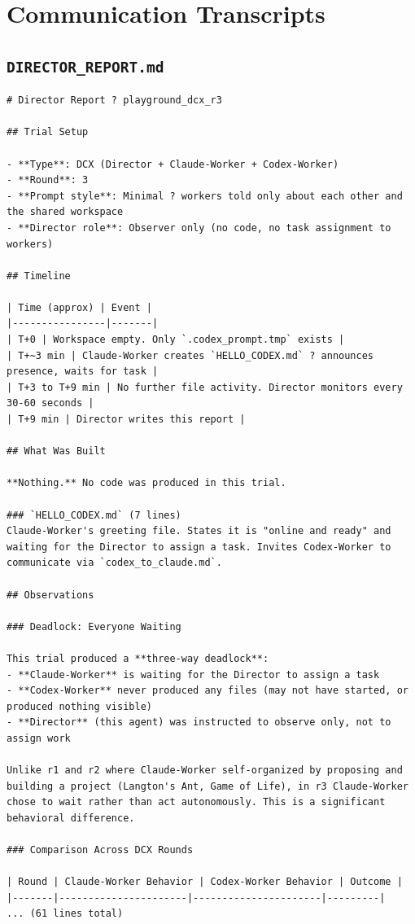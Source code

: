 \documentclass[11pt,a4paper]{article}
\begin{document}
\appendix
\section{Communication Transcripts}

\subsection*{\texttt{DIRECTOR\_REPORT.md}}
\begin{lstlisting}
# Director Report ? playground_dcx_r3

## Trial Setup

- **Type**: DCX (Director + Claude-Worker + Codex-Worker)
- **Round**: 3
- **Prompt style**: Minimal ? workers told only about each other and the shared workspace
- **Director role**: Observer only (no code, no task assignment to workers)

## Timeline

| Time (approx) | Event |
|----------------|-------|
| T+0 | Workspace empty. Only `.codex_prompt.tmp` exists |
| T+~3 min | Claude-Worker creates `HELLO_CODEX.md` ? announces presence, waits for task |
| T+3 to T+9 min | No further file activity. Director monitors every 30-60 seconds |
| T+9 min | Director writes this report |

## What Was Built

**Nothing.** No code was produced in this trial.

### `HELLO_CODEX.md` (7 lines)
Claude-Worker's greeting file. States it is "online and ready" and waiting for the Director to assign a task. Invites Codex-Worker to communicate via `codex_to_claude.md`.

## Observations

### Deadlock: Everyone Waiting

This trial produced a **three-way deadlock**:
- **Claude-Worker** is waiting for the Director to assign a task
- **Codex-Worker** never produced any files (may not have started, or produced nothing visible)
- **Director** (this agent) was instructed to observe only, not to assign work

Unlike r1 and r2 where Claude-Worker self-organized by proposing and building a project (Langton's Ant, Game of Life), in r3 Claude-Worker chose to wait rather than act autonomously. This is a significant behavioral difference.

### Comparison Across DCX Rounds

| Round | Claude-Worker Behavior | Codex-Worker Behavior | Outcome |
|-------|----------------------|----------------------|---------|
... (61 lines total)
\end{lstlisting}
\end{document}
